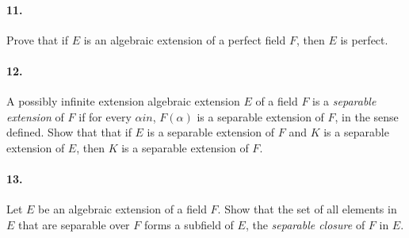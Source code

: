\documentclass[10pt,a4paper]{article}
\begin{document}
\paragraph{11.} Prove that if $E$ is an algebraic extension of a perfect field $F$, then $E$ is perfect.

\paragraph{12.} A possibly infinite extension algebraic extension $E$ of a field $F$ is a \textit{separable extension} of $F$ if for every $\alpha in $, $F(\alpha)$ is a separable extension of $F$, in the sense defined. Show that that if $E$ is a separable extension of $F$ and $K$ is a separable extension of $E$, then $K$ is a separable extension of $F$.

\paragraph{13.} Let $E$ be an algebraic extension of a field $F$. Show that the set of all elements in $E$ that are separable over $F$ forms a subfield of $E$, the \textit{separable closure} of $F$ in $E$.
\end{document}
